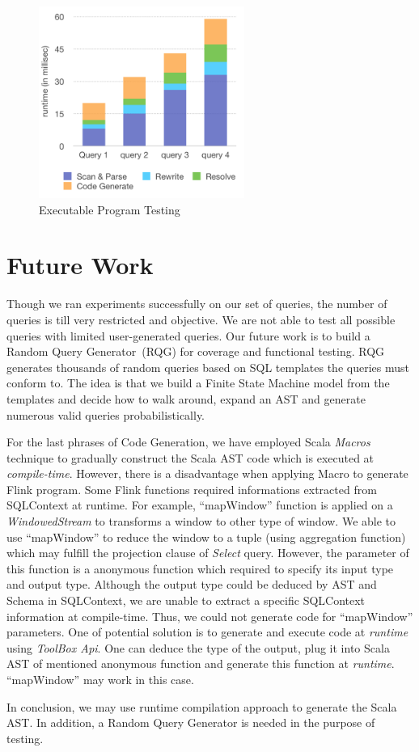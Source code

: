 \begin{figure}[h!] 
\centering    
\includegraphics[width=0.6\textwidth]{ExecutableProgram}
\caption{Executable Program Testing}
\label{fig:ExecutableProgram}
\end{figure}

\section{Future Work}

Though we ran experiments successfully on our set of queries, the number of queries is till very restricted and objective. We are not able to test all possible queries with limited user-generated queries. Our future work is to build a Random Query Generator~(RQG) for coverage and functional testing. RQG generates thousands of random queries based on SQL templates the queries must conform to. The idea is that we build a Finite State Machine model from the templates and decide how to walk around, expand an AST and generate numerous valid queries  probabilistically. 

For the last phrases of Code Generation, we have employed Scala \textit{Macros} technique to gradually construct the Scala AST code which is executed at \textit{compile-time}. However, there is a disadvantage 
when applying Macro to generate Flink program. Some  Flink functions required informations extracted from SQLContext at runtime. For example, ``mapWindow'' function is applied on a \textit{WindowedStream} to  transforms a window to other type of window. We able to use ``mapWindow'' to reduce the window to a tuple (using aggregation function) which may fulfill the projection clause of \textit{Select} query. However, the parameter of this function is a anonymous function which required  to specify its input type and output type. Although the output type could be deduced by AST and Schema in SQLContext, we are unable to extract a specific SQLContext information at compile-time. Thus, we could not generate code for ``mapWindow'' parameters. One of potential solution is to generate and execute code at \textit{runtime} using \textit{ToolBox Api}. One can deduce the type of the output, plug it into Scala AST of mentioned anonymous function and generate this function at \textit{runtime}. ``mapWindow'' may work in this case. 

In conclusion, we may use runtime compilation approach to generate the Scala AST. In addition, a Random Query Generator is needed in the purpose of testing.

